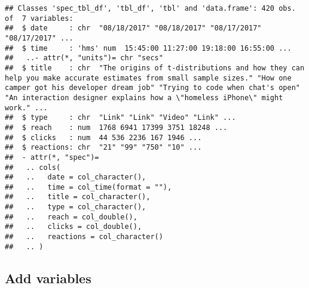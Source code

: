 \documentclass[
]{article}
\begin{document}
\begin{verbatim}
## Classes 'spec_tbl_df', 'tbl_df', 'tbl' and 'data.frame': 420 obs. of  7 variables:
##  $ date     : chr  "08/18/2017" "08/18/2017" "08/17/2017" "08/17/2017" ...
##  $ time     : 'hms' num  15:45:00 11:27:00 19:18:00 16:55:00 ...
##   ..- attr(*, "units")= chr "secs"
##  $ title    : chr  "The origins of t-distributions and how they can help you make accurate estimates from small sample sizes." "How one camper got his developer dream job" "Trying to code when chat's open" "An interaction designer explains how a \"homeless iPhone\" might work." ...
##  $ type     : chr  "Link" "Link" "Video" "Link" ...
##  $ reach    : num  1768 6941 17399 3751 18248 ...
##  $ clicks   : num  44 536 2236 167 1946 ...
##  $ reactions: chr  "21" "99" "750" "10" ...
##  - attr(*, "spec")=
##   .. cols(
##   ..   date = col_character(),
##   ..   time = col_time(format = ""),
##   ..   title = col_character(),
##   ..   type = col_character(),
##   ..   reach = col_double(),
##   ..   clicks = col_double(),
##   ..   reactions = col_character()
##   .. )
\end{verbatim}

\hypertarget{add-variables}{%
\subsection{Add variables}\label{add-variables}}
\end{document}
